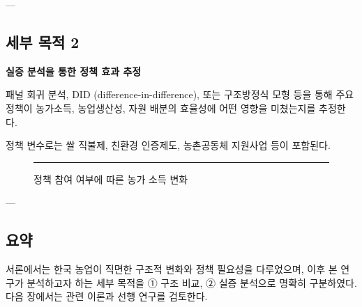 
---

\subsection{세부 목적 2}

\textbf{실증 분석을 통한 정책 효과 추정}  

패널 회귀 분석, DID (difference-in-difference), 또는 구조방정식 모형 등을 통해  
주요 정책이 농가소득, 농업생산성, 자원 배분의 효율성에 어떤 영향을 미쳤는지를 추정한다.  

정책 변수로는 쌀 직불제, 친환경 인증제도, 농촌공동체 지원사업 등이 포함된다.

\begin{figure}[htbp]
  \centering
  \rule{0.65\linewidth}{5cm}
  \caption{정책 참여 여부에 따른 농가 소득 변화}\label{fig:chapter1_3}
\end{figure}

---

\subsection{요약}

서론에서는 한국 농업이 직면한 구조적 변화와 정책 필요성을 다루었으며,  
이후 본 연구가 분석하고자 하는 세부 목적을 ① 구조 비교, ② 실증 분석으로 명확히 구분하였다.  
다음 장에서는 관련 이론과 선행 연구를 검토한다.
